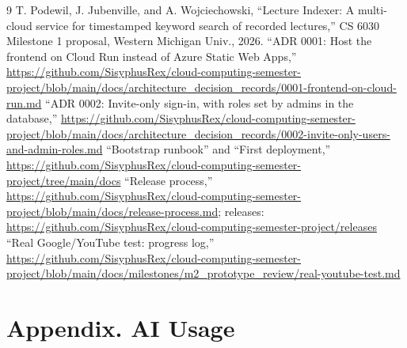 \documentclass[conference]{IEEEtran}
\newcommand{\repo}{https://github.com/SisyphusRex/cloud-computing-semester-project}
\begin{document}
\begin{thebibliography}{9}
 T. Podewil, J. Jubenville, and A. Wojciechowski, ``Lecture Indexer: A multi-cloud service for timestamped keyword search of recorded lectures,'' CS 6030 Milestone 1 proposal, Western Michigan Univ., 2026.
 ``ADR 0001: Host the frontend on Cloud Run instead of Azure Static Web Apps,'' \url{\repo/blob/main/docs/architecture_decision_records/0001-frontend-on-cloud-run.md}
 ``ADR 0002: Invite-only sign-in, with roles set by admins in the database,'' \url{\repo/blob/main/docs/architecture_decision_records/0002-invite-only-users-and-admin-roles.md}
 ``Bootstrap runbook'' and ``First deployment,'' \url{\repo/tree/main/docs}
 ``Release process,'' \url{\repo/blob/main/docs/release-process.md}; releases: \url{\repo/releases}
 ``Real Google/YouTube test: progress log,'' \url{\repo/blob/main/docs/milestones/m2_prototype_review/real-youtube-test.md}
\end{thebibliography}

\onecolumn
\section*{\centering Appendix. AI Usage}
\end{document}
